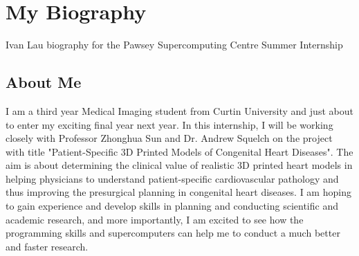 \section{My Biography}
Ivan Lau biography for the Pawsey Supercomputing Centre Summer Internship

\subsection{About Me}
I am a third year Medical Imaging student from Curtin University and just about to enter my exciting final year next year.
In this internship, I will be working closely with Professor Zhonghua Sun and Dr. Andrew Squelch on the project with title "Patient-Specific 3D Printed Models of Congenital Heart Diseases".
The aim is about determining the clinical value of realistic 3D printed heart models in helping physicians to understand patient-specific cardiovascular pathology and thus improving the presurgical planning in congenital heart diseases. 
I am hoping to gain experience and develop skills in planning and conducting scientific and academic research, and more importantly, I am excited to see how the programming skills and supercomputers can help me to conduct a much better and faster research.



